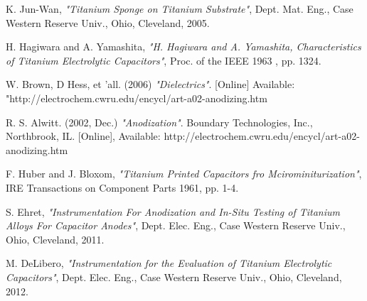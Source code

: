\documentclass[journal]{IEEEtran}
\begin{document}

%
\begin{thebibliography}{1}

 K. Jun-Wan, \emph{"Titanium Sponge on Titanium Substrate"}, Dept. Mat. Eng., Case Western Reserve Univ., Ohio, Cleveland, 2005.

 H. Hagiwara and A. Yamashita, \emph{"H. Hagiwara and A. Yamashita, Characteristics of Titanium Electrolytic Capacitors"}, Proc. of the IEEE 1963 , pp. 1324.

 W. Brown, D Hess, et 'all. (2006) \emph{"Dielectrics"}. [Online] Available: "http://electrochem.cwru.edu/encycl/art-a02-anodizing.htm

 R. S. Alwitt. (2002, Dec.) \emph{"Anodization"}. Boundary Technologies, Inc., Northbrook, IL. [Online], Available: http://electrochem.cwru.edu/encycl/art-a02-anodizing.htm

 F. Huber and J. Bloxom, \emph{"Titanium Printed Capacitors fro Mcirominiturization"}, IRE Transactions on Component Parts 1961, pp. 1-4.

 S. Ehret, \emph{"Instrumentation For Anodization and In-Situ Testing of Titanium Alloys For Capacitor Anodes"}, Dept. Elec. Eng., Case Western Reserve Univ., Ohio, Cleveland, 2011.

 M. DeLibero, \emph{"Instrumentation for the Evaluation of Titanium Electrolytic Capacitors"}, Dept. Elec. Eng., Case Western Reserve Univ., Ohio, Cleveland, 2012.

\end{thebibliography} 
\end{document}
